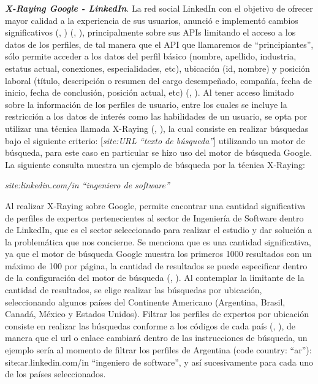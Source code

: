 \textit{\textbf{X-Raying Google - LinkedIn}}. La red social LinkedIn con el objetivo de ofrecer mayor calidad a la experiencia de sus usuarios, anunció e implementó cambios significativos (\citeauthor{LinkChange}, \citeyear{LinkChange}) (\citeauthor{LinkChangeToday}, \citeyear{LinkChangeToday}), principalmente sobre sus APIs limitando el acceso a los datos de los perfiles, de tal manera que el API que llamaremos de “principiantes”, sólo permite acceder a los datos del perfil básico (nombre, apellido, industria, estatus actual, conexiones, especialidades, etc), ubicación (id, nombre) y posición laboral (título, descripción o resumen del cargo desempeñado, compañía, fecha de inicio, fecha de conclusión, posición actual, etc) (\citeauthor{LinkFields},  \citeyear{LinkFields}). Al tener acceso limitado sobre la información de los perfiles de usuario, entre los cuales se incluye la restricción a los datos de interés como las habilidades de un usuario, se opta por utilizar una técnica llamada X-Raying (\citeauthor{xgoogle}, \citeyear{xgoogle}), la cual consiste en realizar búsquedas bajo el siguiente criterio: [\textit{site:URL “texto de búsqueda”}] utilizando un motor de búsqueda, para este caso en particular se hizo uso del motor de búsqueda Google. La siguiente consulta muestra un ejemplo de búsqueda por la técnica X-Raying:
\begin{center}
\textit{site:linkedin.com/in “ingeniero de software”}
\end{center}
Al realizar X-Raying sobre Google, permite encontrar una cantidad significativa de perfiles de expertos pertenecientes al sector de Ingeniería de Software dentro de LinkedIn, que es el sector seleccionado para realizar el estudio y dar solución a la problemática que nos concierne. Se menciona que es una cantidad significativa, ya que el motor de búsqueda Google muestra los primeros 1000 resultados con un máximo de 100 por página, la cantidad de resultados se puede especificar dentro de la configuración del motor de búsqueda (\citeauthor{GooglePage}, \citeyear{GooglePage}). Al contemplar la limitante de la cantidad de resultados, se elige realizar las búsquedas por ubicación, seleccionando algunos países del Continente Americano (Argentina, Brasil, Canadá, México y Estados Unidos). Filtrar los perfiles de expertos por ubicación consiste en realizar las búsquedas conforme a los códigos de cada país (\citeauthor{countriesLink}, \citeyear{countriesLink}), de manera que el url o enlace cambiará dentro de las instrucciones de búsqueda, un ejemplo sería al momento de filtrar los perfiles de Argentina (code country: “ar”): site:ar.linkedin.com/in “ingeniero de software”, y así sucesivamente para cada uno de los países seleccionados.

